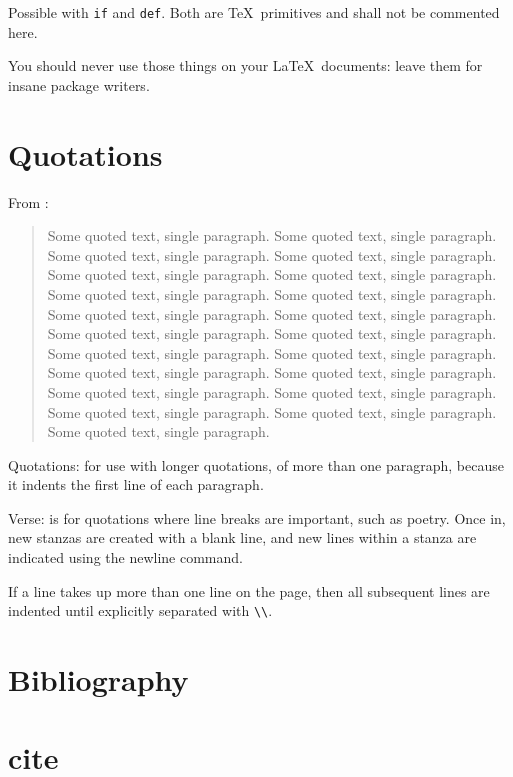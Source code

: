 \documentclass[12pt]{article}
\begin{document}
  Possible with \lstinline|if| and \lstinline|def|. Both are \TeX\ primitives and shall not be commented here.

  You should never use those things on your \LaTeX\ documents: leave them for insane package writers.

\section{Quotations}\label{quotations}

  From \cite{Aa00}:

  \begin{quote}
    Some quoted text, single paragraph. Some quoted text, single paragraph. Some quoted text, single paragraph.
    Some quoted text, single paragraph. Some quoted text, single paragraph. Some quoted text, single paragraph.
    Some quoted text, single paragraph. Some quoted text, single paragraph. Some quoted text, single paragraph.
    Some quoted text, single paragraph. Some quoted text, single paragraph. Some quoted text, single paragraph.
    Some quoted text, single paragraph. Some quoted text, single paragraph. Some quoted text, single paragraph.
    Some quoted text, single paragraph. Some quoted text, single paragraph. Some quoted text, single paragraph.
    Some quoted text, single paragraph. Some quoted text, single paragraph. Some quoted text, single paragraph.
  \end{quote}

  Quotations: for use with longer quotations, of more than one paragraph, because it indents the first line of each paragraph.

  Verse: is for quotations where line breaks are important, such as poetry. Once in, new stanzas are created with a blank line, and new lines within a stanza are indicated using the newline command.

  If a line takes up more than one line on the page, then all subsequent lines are indented until explicitly separated with \lstinline|\\|.

\section{Bibliography}

\section{cite}\label{cite}
\end{document}
